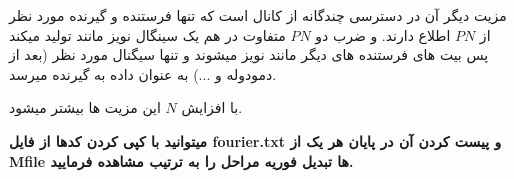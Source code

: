 \documentclass[11pt]{article}
\begin{document}
\begin{persian}
مزیت دیگر آن در دسترسی چندگانه از کانال است که تنها فرستنده و گیرنده مورد نظر از $PN$ اطلاع دارند. و ضرب دو $PN$ متفاوت در هم یک سینگال نویز مانند تولید میکند پس بیت های فرستنده های دیگر مانند نویز میشوند و تنها سیگنال مورد نظر (بعد از دمودوله و ...) به عنوان داده به گیرنده میرسد.

با افزایش $N$ این مزیت ها بیشتر میشود.

\textbf{میتوانید با کپی کردن کدها از فایل fourier.txt و پیست کردن آن در پایان هر یک از Mfile ها تبدیل فوریه مراحل را به ترتیب مشاهده فرمایید. }
\end{persian}
\end{document}
